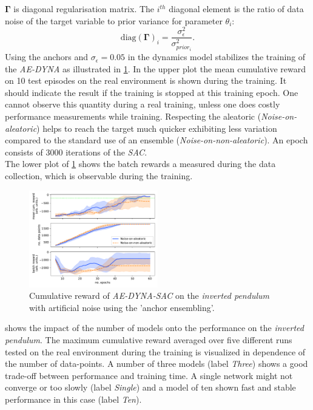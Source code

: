 \documentclass[
reprint,
amsmath,amssymb,amsfonts,clevref,
aps,
prstab,
]{revtex4-2}
\begin{document}
	$\pmb{\Gamma}$ is diagonal regularisation matrix. The $i^{th}$ diagonal element is the ratio of data noise of the target variable to prior variance for parameter $\theta_i$:
	\begin{equation}
		\label{eqn_anch_loss_init}
		\text{diag}(\pmb{\Gamma})_i = \frac{\sigma^2_\epsilon}{\sigma^2_{prior_i}}.
	\end{equation}
	Using the anchors and $\sigma_\epsilon=0.05$ in the dynamics model stabilizes the training of the \emph{AE-DYNA} as illustrated in \cref{fig:comparsion_noise_ae_dyna}. In the upper plot the mean cumulative reward on 10 test episodes on the real environment is shown during the training. It should indicate the result if the training is stopped at this training epoch. One cannot observe this quantity during a real training, unless one does costly performance measurements while training. Respecting the aleatoric (\emph{Noise-on-aleatoric}) helps to reach the target much quicker exhibiting less variation compared to the standard use of an ensemble (\emph{Noise-on-non-aleatoric}). An epoch consists of 3000 iterations of the \emph{SAC}.\\
	The lower plot of \cref{fig:comparsion_noise_ae_dyna} shows the batch rewards a measured during the data collection, which is observable during the training.
	\begin{figure}[h]
		\centering
		\includegraphics*[width=0.5\textwidth]{Figures/Comparison_noise_ae_dyna}
		\caption{Cumulative reward of \emph{AE-DYNA-SAC} on the \emph{inverted pendulum} with artificial noise using the 'anchor ensembling'.}
		\label{fig:comparsion_noise_ae_dyna}
	\end{figure}
	 shows the impact of the number of models onto the performance on the \emph{inverted pendulum}. The maximum cumulative reward averaged over five different runs tested on the real environment during the training is visualized in dependence of the number of data-points. A number of three models (label \emph{Three}) shows a good trade-off between performance and training time. A single network might not converge or too slowly (label \emph{Single}) and a model of ten shown fast and stable performance in this case (label \emph{Ten}).
\end{document}

